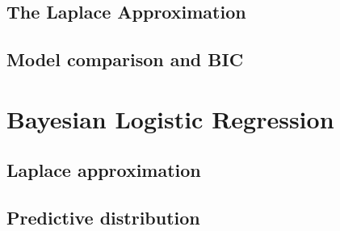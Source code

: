 \subsection{The Laplace Approximation}
\subsection{Model comparison and BIC}

\section{Bayesian Logistic Regression}
\subsection{Laplace approximation}
\subsection{Predictive distribution}